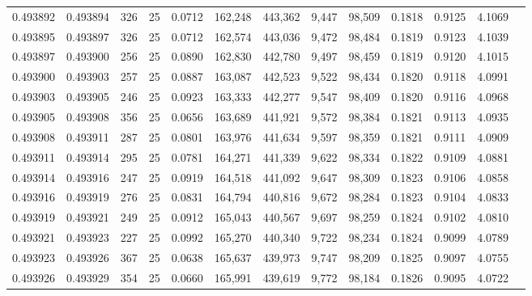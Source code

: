 \begin{tabular}{rrrrrrrrrrrrr}
0.493892 & 0.493894 &   326 &  25 &                                     0.0712 & 162,248 & 443,362 &   9,447 &  98,509 & 0.1818 & 0.9125 & 4.1069 \\
0.493895 & 0.493897 &   326 &  25 &                                     0.0712 & 162,574 & 443,036 &   9,472 &  98,484 & 0.1819 & 0.9123 & 4.1039 \\
0.493897 & 0.493900 &   256 &  25 &                                     0.0890 & 162,830 & 442,780 &   9,497 &  98,459 & 0.1819 & 0.9120 & 4.1015 \\
0.493900 & 0.493903 &   257 &  25 &                                     0.0887 & 163,087 & 442,523 &   9,522 &  98,434 & 0.1820 & 0.9118 & 4.0991 \\
0.493903 & 0.493905 &   246 &  25 &                                     0.0923 & 163,333 & 442,277 &   9,547 &  98,409 & 0.1820 & 0.9116 & 4.0968 \\
0.493905 & 0.493908 &   356 &  25 &                                     0.0656 & 163,689 & 441,921 &   9,572 &  98,384 & 0.1821 & 0.9113 & 4.0935 \\
0.493908 & 0.493911 &   287 &  25 &                                     0.0801 & 163,976 & 441,634 &   9,597 &  98,359 & 0.1821 & 0.9111 & 4.0909 \\
0.493911 & 0.493914 &   295 &  25 &                                     0.0781 & 164,271 & 441,339 &   9,622 &  98,334 & 0.1822 & 0.9109 & 4.0881 \\
0.493914 & 0.493916 &   247 &  25 &                                     0.0919 & 164,518 & 441,092 &   9,647 &  98,309 & 0.1823 & 0.9106 & 4.0858 \\
0.493916 & 0.493919 &   276 &  25 &                                     0.0831 & 164,794 & 440,816 &   9,672 &  98,284 & 0.1823 & 0.9104 & 4.0833 \\
0.493919 & 0.493921 &   249 &  25 &                                     0.0912 & 165,043 & 440,567 &   9,697 &  98,259 & 0.1824 & 0.9102 & 4.0810 \\
0.493921 & 0.493923 &   227 &  25 &                                     0.0992 & 165,270 & 440,340 &   9,722 &  98,234 & 0.1824 & 0.9099 & 4.0789 \\
0.493923 & 0.493926 &   367 &  25 &                                     0.0638 & 165,637 & 439,973 &   9,747 &  98,209 & 0.1825 & 0.9097 & 4.0755 \\
0.493926 & 0.493929 &   354 &  25 &                                     0.0660 & 165,991 & 439,619 &   9,772 &  98,184 & 0.1826 & 0.9095 & 4.0722 \\

\end{tabular}
